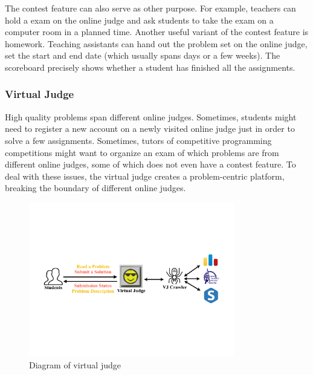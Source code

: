             The contest feature can also serve as other purpose.
            For example, teachers can hold a exam on the online judge
            and ask students to take the exam on a computer room in a planned time.
            Another useful variant of the contest feature is homework.
            Teaching assistants can hand out the problem set on the online judge,
            set the start and end date (which usually spans days or a few weeks).
            The scoreboard precisely shows whether a student has finished all the assignments.

        \subsubsection{Virtual Judge}

            High quality problems span different online judges.
            Sometimes, students might need to register a new account on a newly visited online judge
            just in order to solve a few assignments.
            Sometimes, tutors of competitive programming competitions might want to organize an exam
            of which problems are from different online judges,
            some of which does not even have a contest feature.
            To deal with these issues, the virtual judge \cite{vjudge} creates a problem-centric platform,
            breaking the boundary of different online judges.

            \begin{figure}[htp]
                \centering
                \includegraphics[width=0.8\textwidth]{img/vjudge.pdf}
                \caption{Diagram of virtual judge}
                \label{fig:vjudge}
            \end{figure}

